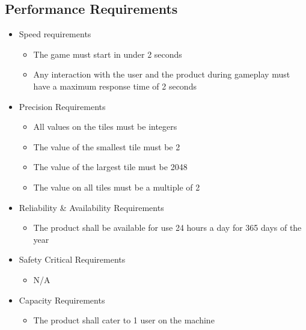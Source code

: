 \subsection{Performance Requirements}
\begin{itemize}
\item Speed requirements
\begin{itemize}
\item The game must start in under 2 seconds
\item Any interaction with the user and the product during gameplay must have a maximum response time of 2 seconds
\end{itemize}

\item{Precision Requirements}
\begin{itemize}
\item All values on the tiles must be integers 
\item The value of the smallest tile must be 2
\item The value of the largest tile must be 2048
\item The value on all tiles must be a multiple of 2
\end{itemize}

\item{Reliability \& Availability Requirements}
\begin{itemize}
\item The product shall be available for use 24 hours a day for 365 days of the year
\end{itemize}
\item{Safety Critical Requirements}
\begin{itemize}
\item N/A
\end{itemize}
\item{Capacity Requirements}
\begin{itemize}
\item The product shall cater to 1 user on the machine
\end{itemize}
\end{itemize}


